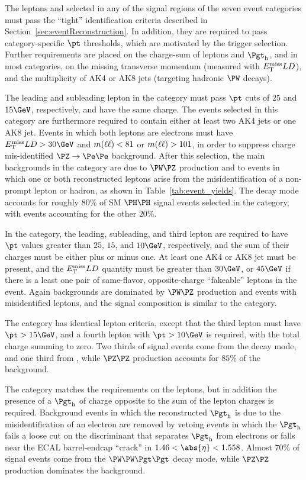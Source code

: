 The leptons and \tauh selected in any of the signal regions of the seven event categories must pass the ``tight''
identification criteria described in Section~\ref{sec:eventReconstruction}.
In addition, they are required to pass category-specific $\pt$ thresholds,
which are motivated by the trigger selection.
Further requirements are placed on the charge-sum of leptons and $\tauh$,
and in most categories, on the missing transverse momentum (measured with $E_{\mathrm{T}}^\text{miss} LD$),
and the multiplicity of AK4 or AK8 jets (targeting hadronic $\PW$ decays). 

The leading and subleading lepton in the \llss category must pass $\pt$ cuts of $25$ and $15\GeV$, respectively,
and have the same charge.
The events selected in this category are furthermore required to contain either at least two AK4 jets or one AK8 jet. %
Events in which both leptons are electrons must have $\metLD > 30\GeV$ and $m(\ell\ell) < 81$ or $m(\ell\ell) > 101$, in order to suppress
charge mis-identified $\Zee$ background.
After this selection, the main backgrounds in the \llss category are due to $\PW\PZ$ production
and to events in which one or both reconstructed leptons arise from the misidentification of a non-prompt lepton or hadron,
as shown in Table~\ref{tab:event_yields}.
The \WWWW decay mode accounts for roughly $80\%$ of
SM $\HH$ signal events selected in the \llss category, with \WWtt events accounting for the other $20\%$.

In the \lllnot category, 
the leading, subleading, and third lepton are required to
have $\pt$ values greater than $25$, $15$, and $10\GeV$, respectively, and the sum of their charges must be either plus or minus one.
At least one AK4 or AK8 jet must be present, and the $E_{\mathrm{T}}^\text{miss} LD$ quantity must be greater than $30\GeV$,
or $45\GeV$ if there is a least one pair of same-flavor, opposite-charge ``fakeable''
leptons in the event.  Again backgrounds are dominated by $\PW\PZ$ production and events with misidentified
leptons, and the signal composition is similar to the \llss category.

The \llll category has identical lepton criteria, except that the third lepton
must have $\pt > 15\GeV$, and a fourth lepton with $\pt > 10\GeV$ is required, with
the total charge summing to zero.  Two thirds of signal events come from the \WWWW decay mode, 
and one third from \WWtt, while $\PZ\PZ$ production accounts for $85\%$ of the background.

The \lllt category matches the \lllnot requirements on the leptons, 
but in addition the presence of a $\tauh$ of charge opposite to the sum of the lepton charges is required.  
Background events in which the reconstructed $\tauh$ is due to the misidentification of an electron
are removed by vetoing events in which the $\tauh$ fails a loose cut on the discriminant that separates $\tauh$ from electrons
or falls near the ECAL barrel-endcap ``crack'' in $1.46 < \abs{\eta} < 1.558$.
Almost $70\%$ of signal events come from the $\WWtt$ decay mode,
while $\PZ\PZ$ production dominates the background.  

